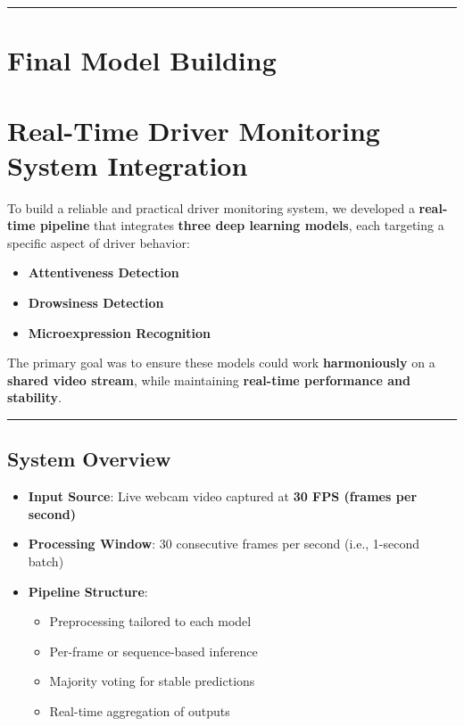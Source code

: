 \documentclass[
  letterpaper,
  DIV=11,
  numbers=noendperiod]{scrreport}
\providecommand{\tightlist}{%
  \setlength{\itemsep}{0pt}\setlength{\parskip}{0pt}}
\begin{document}
\begin{center}\rule{0.5\linewidth}{0.5pt}\end{center}

\section{Final Model Building}\label{final-model-building}

\section{Real-Time Driver Monitoring System
Integration}\label{real-time-driver-monitoring-system-integration}

To build a reliable and practical driver monitoring system, we developed
a \textbf{real-time pipeline} that integrates \textbf{three deep
learning models}, each targeting a specific aspect of driver behavior:

\begin{itemize}
\tightlist
\item
  \textbf{Attentiveness Detection}
\item
  \textbf{Drowsiness Detection}
\item
  \textbf{Microexpression Recognition}
\end{itemize}

The primary goal was to ensure these models could work
\textbf{harmoniously} on a \textbf{shared video stream}, while
maintaining \textbf{real-time performance and stability}.

\begin{center}\rule{0.5\linewidth}{0.5pt}\end{center}

\subsection{System Overview}\label{system-overview}

\begin{itemize}
\tightlist
\item
  \textbf{Input Source}: Live webcam video captured at \textbf{30 FPS
  (frames per second)}
\item
  \textbf{Processing Window}: 30 consecutive frames per second (i.e.,
  1-second batch)
\item
  \textbf{Pipeline Structure}:

  \begin{itemize}
  \tightlist
  \item
    Preprocessing tailored to each model
  \item
    Per-frame or sequence-based inference
  \item
    Majority voting for stable predictions
  \item
    Real-time aggregation of outputs
  \end{itemize}
\end{itemize}
\end{document}
